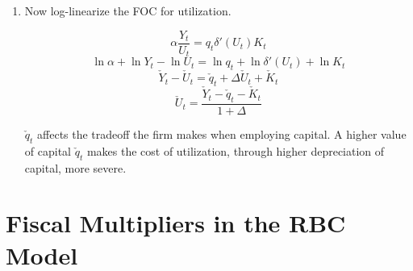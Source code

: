 \documentclass[11pt]{article}
\begin{document}
\begin{enumerate}
        \item Now log-linearize the FOC for utilization.

            $$ \alpha \frac{Y_t}{U_t} = q_t \delta'(U_t) K_t $$
            $$ \ln \alpha + \ln Y_t - \ln U_t = \ln q_t + \ln \delta'(U_t) + \ln K_t $$
            $$ \check Y_t - \check U_t = \check q_t + \Delta \check U_t + \check K_t $$
            $$ \check U_t = \frac{\check Y_t - \check q_t - \check K_t}{1 + \Delta} $$

        $\check q_t$ affects the tradeoff the firm makes when employing capital. A higher value of capital $\check q_t$ makes the cost of utilization, through higher depreciation of capital, more severe.

    \end{enumerate}

\section{Fiscal Multipliers in the RBC Model}
\end{document}
